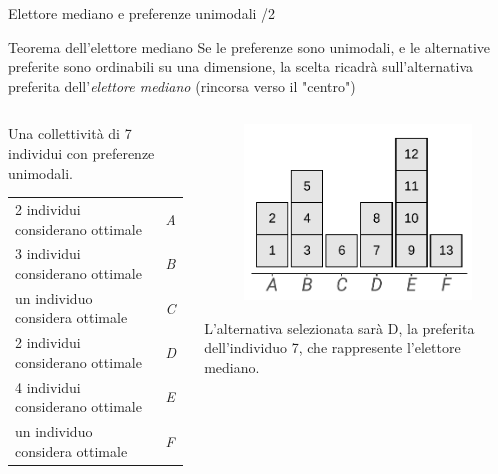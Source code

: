 \documentclass[aspectratio=64,11pt]{beamer}
\begin{document}
\begin{frame}{Elettore mediano e preferenze unimodali /2}
\begin{block}{Teorema dell'elettore mediano}
Se le preferenze sono unimodali, e le alternative preferite sono ordinabili
 su una dimensione, la scelta ricadrà sull'alternativa preferita
 dell'\emph{elettore mediano} (rincorsa verso il "centro")
\end{block}

\begin{columns}
\begin{column}{.5\columnwidth}
Una collettività di 7 individui con preferenze unimodali.
\medskip

\begin{tabular}[c]{ll}
  2 individui considerano ottimale&\emph{A}\\
  3 individui considerano ottimale&\emph{B}\\
  un individuo considera ottimale &\emph{C}\\
  2 individui considerano ottimale &\emph{D}\\
  4 individui considerano ottimale &\emph{E}\\
  un individuo considera ottimale &\emph{F}
\end{tabular}
\end{column}

\begin{column}{.5\columnwidth}
\begin{figure}[htbp]
\centering
\includegraphics[width=.8\textwidth]{./figure/elettore-mediano-distribuzione.pdf}
\end{figure}

L'alternativa selezionata sarà D, la preferita dell'individuo 7, che rappresente l'elettore mediano.
\end{column}
\end{columns}
\end{frame}
\end{document}
